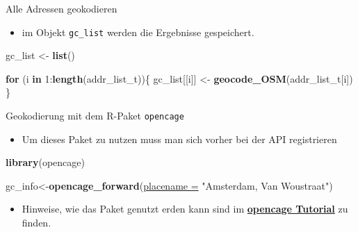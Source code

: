 \documentclass[ignorenonframetext,]{beamer}
\newenvironment{Shaded}{\begin{snugshade}}{\end{snugshade}}
\newcommand{\ControlFlowTok}[1]{\textcolor[rgb]{0.26,0.66,0.93}{\textbf{#1}}}
\newcommand{\DataTypeTok}[1]{\textcolor[rgb]{0.74,0.68,0.62}{\underline{#1}}}
\newcommand{\DecValTok}[1]{\textcolor[rgb]{0.27,0.67,0.26}{#1}}
\newcommand{\KeywordTok}[1]{\textcolor[rgb]{0.26,0.66,0.93}{\textbf{#1}}}
\newcommand{\NormalTok}[1]{\textcolor[rgb]{0.74,0.68,0.62}{#1}}
\newcommand{\OperatorTok}[1]{\textcolor[rgb]{0.74,0.68,0.62}{#1}}
\newcommand{\StringTok}[1]{\textcolor[rgb]{0.02,0.61,0.04}{#1}}
\providecommand{\tightlist}{%
  \setlength{\itemsep}{0pt}\setlength{\parskip}{0pt}}
\begin{document}
\begin{frame}[fragile]{Alle Adressen geokodieren}
\protect\hypertarget{alle-adressen-geokodieren}{}

\begin{itemize}
\tightlist
\item
  im Objekt \texttt{gc\_list} werden die Ergebnisse gespeichert.
\end{itemize}

\begin{Shaded}
\begin{Highlighting}[]
\NormalTok{gc_list <-}\StringTok{ }\KeywordTok{list}\NormalTok{()}

\ControlFlowTok{for}\NormalTok{ (i }\ControlFlowTok{in} \DecValTok{1}\OperatorTok{:}\KeywordTok{length}\NormalTok{(addr_list_t))\{}
\NormalTok{  gc_list[[i]] <-}\StringTok{ }\KeywordTok{geocode_OSM}\NormalTok{(addr_list_t[i])}
\NormalTok{\}}
\end{Highlighting}
\end{Shaded}

\end{frame}

\begin{frame}[fragile]{Geokodierung mit dem R-Paket \texttt{opencage}}
\protect\hypertarget{geokodierung-mit-dem-r-paket-opencage}{}

\begin{itemize}
\tightlist
\item
  Um dieses Paket zu nutzen muss man sich vorher bei der API
  registrieren
\end{itemize}

\begin{Shaded}
\begin{Highlighting}[]
\KeywordTok{library}\NormalTok{(opencage)}
\end{Highlighting}
\end{Shaded}

\begin{Shaded}
\begin{Highlighting}[]
\NormalTok{gc_info<-}\KeywordTok{opencage_forward}\NormalTok{(}\DataTypeTok{placename =} 
                              \StringTok{"Amsterdam, Van Woustraat"}\NormalTok{)}
\end{Highlighting}
\end{Shaded}

\begin{itemize}
\tightlist
\item
  Hinweise, wie das Paket genutzt erden kann sind im
  \href{https://ropensci.org/tutorials/opencage_tutorial/}{\textbf{opencage
  Tutorial}} zu finden.
\end{itemize}

\end{frame}
\end{document}
